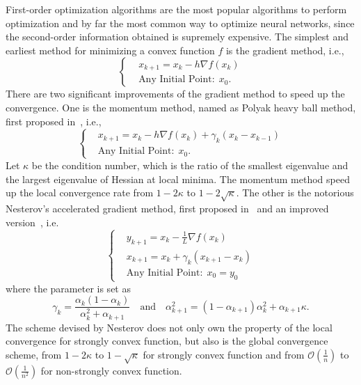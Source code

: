 \documentclass[11pt,fceqn]{article}
\numberwithin{equation}{section}
\theoremstyle{definition}
\begin{document}
First-order optimization algorithms are the most popular algorithms to perform optimization and by far the most common way to optimize neural networks, since the second-order information obtained is supremely expensive.  The simplest and earliest method for minimizing a convex function $f$ is the gradient method, i.e.,
\begin{equation}
\label{eqn:gradient}
\left\{\begin{aligned}
& x_{k+1} = x_{k} - h \nabla f(x_{k})\\
& \text{Any Initial Point}: \; x_{0}.
\end{aligned}\right.
\end{equation}
There are two significant improvements of the gradient method to speed up the convergence. One is the momentum method, named as Polyak heavy ball method, first proposed in~\citep{polyak1964some}, i.e.,
\begin{equation}
\label{eqn:momentum}
\left\{\begin{aligned}
& x_{k+1} = x_{k} - h \nabla f(x_{k}) + \gamma_{k} (x_{k} - x_{k-1})\\
& \text{Any Initial Point}: \; x_{0}.
\end{aligned}\right.
\end{equation}
Let $\kappa$ be the condition number, which is the ratio of the smallest eigenvalue and the largest eigenvalue of Hessian at local minima. The momentum method speed up the local convergence rate from $1 - 2\kappa$ to $1 - 2\sqrt{\kappa}$. The other is the notorious Nesterov's accelerated gradient method, first proposed in~\citep{nesterov1983method} and an improved version~\citep{nesterov1988general, nesterov2013introductory}, i.e.
\begin{equation}
\label{eqn:nesterov}
\left\{\begin{aligned}
& y_{k+1} = x_{k} - \frac{1}{L} \nabla f(x_{k}) \\
& x_{k+1} = x_{k} + \gamma_{k}(x_{k+1} - x_{k})\\
& \text{Any Initial Point}: \; x_{0} = y_{0}
\end{aligned}\right.
\end{equation}
where the parameter is set as 
$$
\gamma_{k} = \frac{\alpha_{k} (1 - \alpha_{k})}{\alpha_{k}^{2} + \alpha_{k+1}}\quad \text{and}\quad \alpha_{k+1}^{2} = (1 - \alpha_{k+1})\alpha_{k}^{2} + \alpha_{k+1} \kappa.
$$
The scheme devised by Nesterov does not only own the property of the local convergence for strongly convex function, but also is the global convergence scheme, from $1 - 2\kappa$ to $1 - \sqrt{\kappa}$ for strongly convex function and from $\mathcal{O}\left(\frac{1}{n}\right)$ to $\mathcal{O}\left(\frac{1}{n^{2}}\right)$ for non-strongly convex function.
\end{document}

